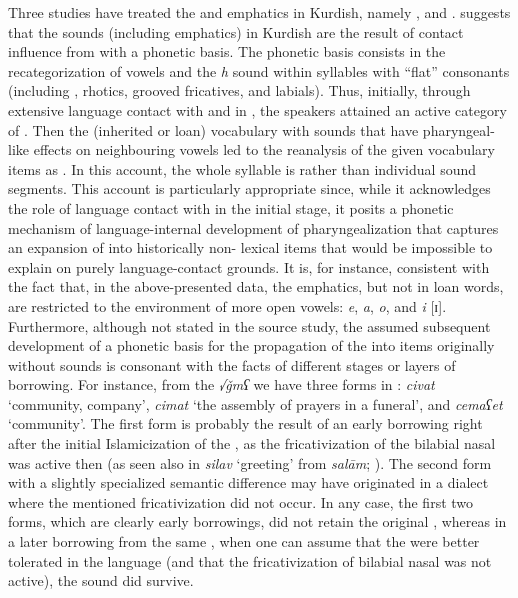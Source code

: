 \documentclass[output=paper]{langsci/langscibook}
\begin{document}
Three studies have treated the  and emphatics in Kurdish, namely \citet{Kahn1976}, \citet{Anonbyforthcoming} and \citet{Barryforthcoming}. \citet{Barryforthcoming} suggests that the  sounds (including emphatics) in Kurdish are the result of contact influence from  with a phonetic basis. The phonetic basis consists in the recategorization of vowels and the \textit{h} sound within syllables with “flat” consonants (including , rhotics, grooved fricatives, and labials). Thus, initially, through extensive language contact with and  in , the speakers attained an active category of . Then the (inherited or loan) vocabulary with sounds that have pharyngeal-like effects on neighbouring vowels led to the reanalysis of the given vocabulary items as . In this account, the whole syllable is  rather than individual sound segments. This account is particularly appropriate since, while it acknowledges the role of language contact with  in the initial stage, it posits a phonetic mechanism of language-internal development of pharyngealization that captures an expansion of  into historically non- lexical items that would be impossible to explain on purely language-contact grounds. It is, for instance, consistent with the fact that, in the above-presented data, the emphatics, but not  in loan words, are restricted to the environment of more open vowels: \textit{e}, \textit{a}, \textit{o}, and \textit{i} [ɪ]. Furthermore, although not stated in the source study, the assumed subsequent development of a phonetic basis for the propagation of the  into items originally without  sounds is consonant with the facts of different stages or layers of borrowing. For instance, from the   \textit{√ǧmʕ} we have three forms in : \textit{civat} ‘community, company’, \textit{cimat} ‘the assembly of prayers in a funeral’, and \textit{cemaʕet} ‘community’. The first form is probably the result of an early borrowing right after the  initial Islamicization of the , as the fricativization of the bilabial nasal was active then (as seen also in \textit{silav} ‘greeting’ from  \textit{salām}; \citealt{Paul2008}). The second form with a slightly specialized semantic difference may have originated in a dialect where the mentioned fricativization did not occur. In any case, the first two forms, which are clearly early borrowings, did not retain the original , whereas in a later borrowing from the same , when one can assume that the  were better tolerated in the language (and that the fricativization of bilabial nasal was not active), the  sound did survive.   
\end{document}
